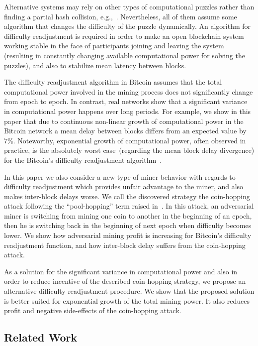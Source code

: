 \documentclass[]{llncs}
\newcommand{\attackname}{coin-hopping attack}
\begin{document}
Alternative systems may rely on other types of computational puzzles rather than finding a partial hash collision, e.g.,~\cite{miller2014permacoin,biryukov2017equihash}. Nevertheless, all of them assume some algorithm that changes the difficulty of the puzzle dynamically. An algorithm for difficulty readjustment is required in order to make an open blockchain system working stable in the face of participants joining and leaving the system (resulting in constantly changing available computational power for solving the puzzles), and also to stabilize mean latency between blocks. 

The difficulty readjustment algorithm in Bitcoin assumes that the total computational power involved in the mining process does not significantly change from epoch to epoch. In contrast, real networks show that a significant variance in computational power happens over long periods.
For example, we show in this paper that due to continuous non-linear growth of computational power in the Bitcoin network a mean delay between blocks differs from an expected value by 7\%.
Noteworthy, exponential growth of computational power, often observed in practice, is the absolutely worst case~(regarding the mean block delay divergence) for the Bitcoin's difficulty readjustment algorithm~\cite{kraft2015difficulty}.
 
In this paper we also consider a new type of miner behavior with regards to difficulty readjustment which provides unfair advantage to the miner, and also makes inter-block delays worse. We call the discovered strategy the \attackname{} following the ``pool-hopping'' term raised in~\cite{rosenfeld2011analysis}. In this attack, an adversarial miner is switching from mining one coin to another in the beginning of an epoch, then he is switching back in the beginning of next epoch when difficulty becomes lower. We show how adversarial mining profit is increasing for Bitcoin's difficulty readjustment function, and how inter-block delay suffers from the \attackname{}.

As a solution for the significant variance in computational power and also in order to reduce incentive of the described coin-hopping strategy, we propose an alternative difficulty readjustment procedure. We show that the proposed solution is better suited for exponential growth of the total mining power. It also reduces profit and negative side-effects of the coin-hopping attack.

\subsection{Related Work}
\end{document}
